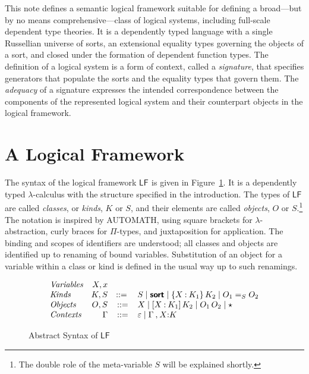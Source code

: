 \documentclass[11pt,twoside]{article}
\newcommand{\braces}[1]{\{#1\}}
\newcommand{\bracks}[1]{[#1]}
\newcommand{\LF}[1][]{\ensuremath{\mathsf{LF}_{#1}}}
\newcommand{\bnfdef}{\mathrel{{:}{:}{=}}}
\newcommand{\bnfalt}{\mathrel{\mid}}
\newcommand{\sortclass}{\ensuremath{\textbf{\textsf{sort}}}}
\newcommand{\eqclass}[3]{{#2}=_{#1}{#3}}
\newcommand{\piclass}[3]{\braces{{#2}\mathbin{:}{#1}}\,{#3}}
\newcommand{\lamobj}[3]{\bracks{{#2}\mathbin{:}{#1}}\,{#3}}
\newcommand{\appobj}[2]{{#1}\,{#2}}
\newcommand{\reflobj}{\star}
\newcommand{\empctx}{\varepsilon}
\newcommand{\snocctx}[3]{{#1}\mathbin{,}{#2}{:}{#3}}
\begin{document}
This note defines a semantic logical framework suitable for defining a broad---but by no
means comprehensive---class of logical systems, including full-scale dependent type
theories.  It is a dependently typed language with a single Russellian universe of sorts,
an extensional equality types governing the objects of a sort, and closed under the
formation of dependent function types.  The definition of a logical system is a form of
context, called a \emph{signature}, that specifies generators that populate the sorts and
the equality types that govern them.  The \emph{adequacy} of a signature expresses the
intended correspondence between the components of the represented logical system and their
counterpart objects in the logical framework.

\section{A Logical Framework}

The syntax of the logical framework \LF{} is given in Figure~\ref{fig:lf-syntax}.  It is a
dependently typed $\lambda$-calculus with the structure specified in the introduction.  The
types of \LF{} are called \emph{classes}, or \emph{kinds}, $K$ or $S$, and their elements
are called \emph{objects}, $O$ or $S$.\footnote{The double role of the meta-variable $S$
  will be explained shortly.}  The notation is inspired by \textsf{AUTOMATH}, using square
brackets for $\lambda$-abstraction, curly braces for $\Pi$-types, and juxtaposition for
application.  The binding and scopes of identifiers are understood; all classes and
objects are identified up to renaming of bound variables.  Substitution of an object for a
variable within a class or kind is defined in the usual way up to such renamings.

\begin{figure}[tp]
  
  \begin{displaymath}
    \begin{array}{lrcl}
      \textit{Variables} & X,x \\
      \textit{Kinds} & K, S & \bnfdef{} & S \bnfalt \sortclass \bnfalt \piclass{K_{1}}{X}{K_{2}}
                                          \bnfalt \eqclass{S}{O_{1}}{O_{2}} \\
      \textit{Objects} & O, S & \bnfdef & X \bnfalt \lamobj{K_{1}}{X}{K_{2}} \bnfalt
                                          \appobj{O_{1}}{O_{2}} \bnfalt \reflobj{} \\
      \textit{Contexts} & \Gamma & \bnfdef & \empctx{} \bnfalt \snocctx{\Gamma}{X}{K}
    \end{array}
  \end{displaymath}

  \caption{Abstract Syntax of \LF{}}
  \label{fig:lf-syntax}
\end{figure}
\end{document}

